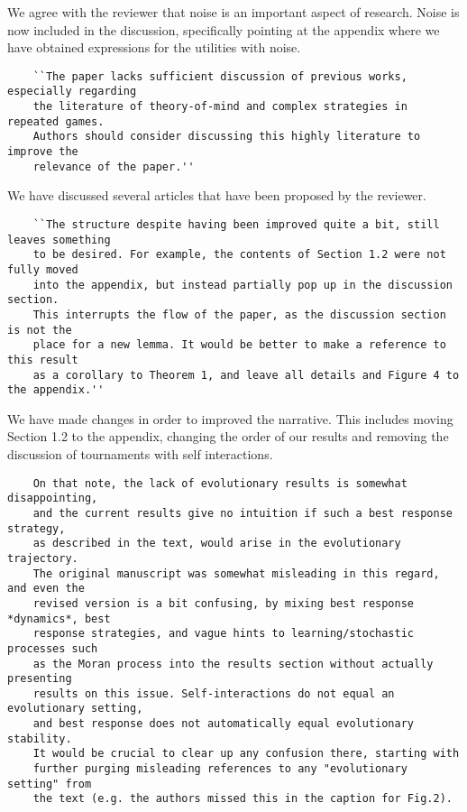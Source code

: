 \documentclass{article}
\begin{document}
We agree with the reviewer that noise is an important aspect of research. Noise
is now included in the discussion, specifically pointing at the appendix where
we have obtained expressions for the utilities with noise.

\begin{verbatim}
    ``The paper lacks sufficient discussion of previous works, especially regarding
    the literature of theory-of-mind and complex strategies in repeated games.
    Authors should consider discussing this highly literature to improve the
    relevance of the paper.''
\end{verbatim}

We have discussed several articles
that have been proposed by the reviewer.

\begin{verbatim}
    ``The structure despite having been improved quite a bit, still leaves something
    to be desired. For example, the contents of Section 1.2 were not fully moved
    into the appendix, but instead partially pop up in the discussion section.
    This interrupts the flow of the paper, as the discussion section is not the
    place for a new lemma. It would be better to make a reference to this result
    as a corollary to Theorem 1, and leave all details and Figure 4 to the appendix.''
\end{verbatim}

We have made changes in order to improved the narrative. This includes moving
Section 1.2 to the appendix, changing the order of our results and removing
the discussion of tournaments with self interactions.

\begin{verbatim}
    On that note, the lack of evolutionary results is somewhat disappointing,
    and the current results give no intuition if such a best response strategy,
    as described in the text, would arise in the evolutionary trajectory.
    The original manuscript was somewhat misleading in this regard, and even the
    revised version is a bit confusing, by mixing best response *dynamics*, best
    response strategies, and vague hints to learning/stochastic processes such
    as the Moran process into the results section without actually presenting
    results on this issue. Self-interactions do not equal an evolutionary setting,
    and best response does not automatically equal evolutionary stability.
    It would be crucial to clear up any confusion there, starting with
    further purging misleading references to any "evolutionary setting" from
    the text (e.g. the authors missed this in the caption for Fig.2).
\end{verbatim}
\end{document}
